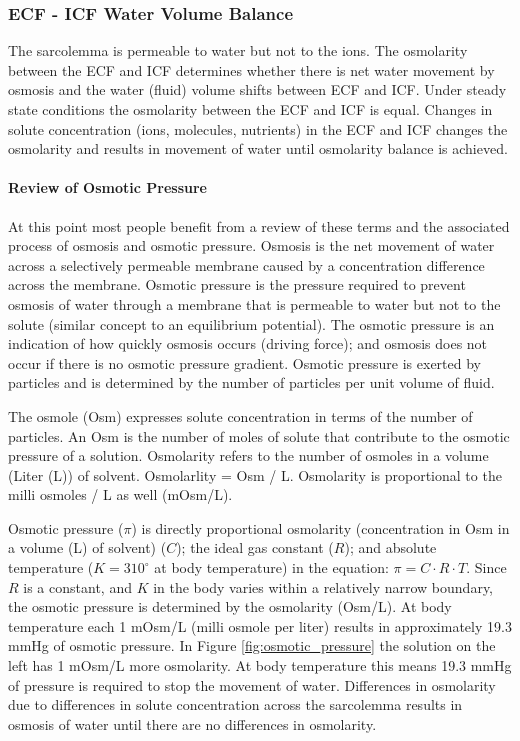 \subsubsection{ECF - ICF Water Volume Balance}

The sarcolemma is permeable to water but not to the ions. The osmolarity between the ECF and ICF determines whether there is net water movement by osmosis and the water (fluid) volume shifts between ECF and ICF. Under steady state conditions the osmolarity between the ECF and ICF is equal. Changes in solute concentration (ions, molecules, nutrients) in the ECF and ICF changes the osmolarity and results in movement of water until osmolarity balance is achieved.

\paragraph{Review of Osmotic Pressure}

At this point most people benefit from a review of these terms and the associated process of osmosis and osmotic pressure. Osmosis is the net movement of water across a selectively permeable membrane caused by a concentration difference across the membrane. Osmotic pressure is the pressure required to prevent osmosis of water through a membrane that is permeable to water but not to the solute (similar concept to an equilibrium potential). The osmotic pressure is an indication of how quickly osmosis occurs (driving force); and osmosis does not occur if there is no osmotic pressure gradient. Osmotic pressure is exerted by particles and is determined by the number of particles per unit volume of fluid. 

The osmole (Osm) expresses solute concentration in terms of the number of particles. An Osm is the number of moles of solute that contribute to the osmotic pressure of a solution. Osmolarity refers to the number of osmoles in a volume (Liter (L)) of solvent. Osmolarlity = Osm / L. Osmolarity is proportional to the milli osmoles / L as well (mOsm/L).

Osmotic pressure ($\pi$) is directly proportional osmolarity (concentration in Osm in a volume (L) of solvent) ($C$); the ideal gas constant ($R$); and absolute temperature ($K = 310^{\circ}$ at body temperature) in the equation: $\pi = C \cdot R \cdot T$. Since $R$ is a constant, and $K$ in the body varies within a relatively narrow boundary, the osmotic pressure is determined by the osmolarity (Osm/L). At body temperature each 1 mOsm/L (milli osmole per liter) results in approximately 19.3 mmHg of osmotic pressure. In Figure \ref{fig:osmotic_pressure} the solution on the left has 1 mOsm/L more osmolarity. At body temperature this means 19.3 mmHg of pressure is required to stop the movement of water. Differences in osmolarity due to differences in solute concentration across the sarcolemma results in osmosis of water until there are no differences in osmolarity.

